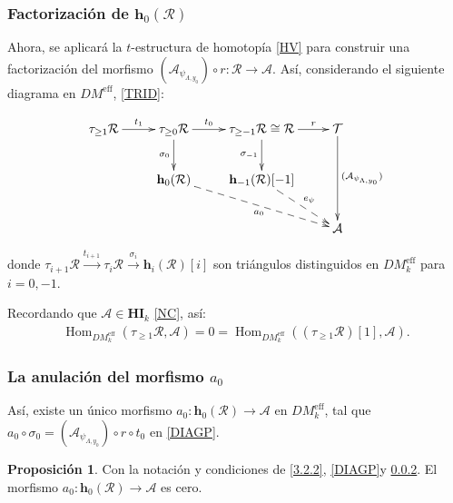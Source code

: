 \documentclass[10pt]{amsart}
\theoremstyle{definition}
\newtheorem{proposition}[definition]{Proposici\'on}
\theoremstyle{remark}
\theoremstyle{definition}
\begin{document}
\subsubsection{Factorización de $\mathbf{h}_{0}(\mathcal R )$ } Ahora, se aplicará la $t$-estructura de homotopía \ref{HV} para construir una factorización del morfismo $(\mathcal{A}_{\psi_{\Lambda,y_{0}}})\circ r:\mathcal{R}\to\mathcal{A}$. Así, considerando el siguiente diagrama en $DM^{\mathrm{eff}}$, \ref{TRID}:


\begin{align}\label{DIAGP}
\begin{split}
\xymatrix{\tau _{\geq 1}\mathcal R \ar[r]^-{t_1}&\tau _{\geq 0}\mathcal R 
\ar[r]^-{t_0} \ar[d]_-{\sigma _0}
& \tau _{\geq -1}\mathcal R \cong \mathcal R 
\ar[d]_-{\sigma _{-1}}  \ar[r]^-r& \mathcal T
\ar[dd]^-{(\mathcal A _{\psi _{\Lambda , y_0}})} \\
& \mathbf{h}_{0} (\mathcal R ) \ar@{-->}[drr]_-{a_0}& \mathbf{h}_{-1} (
\mathcal R )[-1] 
\ar@{-->}[dr]^-{e_\psi}&  \\
&&& \mathcal A}
\end{split}
\end{align}


donde $\tau_{i+1}\mathcal{R} \stackrel{t_{i+1}}{\longrightarrow}
\tau_i \mathcal{R} \stackrel{\sigma_i}{\longrightarrow}
\mathbf{h}_i (\mathcal{R}) [i]$ son triángulos distinguidos en $DM^{\mathrm{eff}}_{k}$
para $i=0, -1$.

Recordando que $\mathcal{A} \in \mathbf{HI}_{k}$ \ref{NC}, así:
\begin{align*}
\operatorname{Hom}_{DM^{\mathrm{eff}}_{k}}(\tau_{\geq 1}\mathcal{R}, \mathcal{A})=0=
\operatorname{Hom}_{DM^{\mathrm{eff}}_{k}}((\tau_{\geq 1}\mathcal{R})[1], \mathcal{A}).
\end{align*}

\subsubsection{La anulación del morfismo  $a_0$}\label{1st.factor}
Así, existe un único morfismo $a_0:\mathbf{h}_0(\mathcal{R}) \rightarrow \mathcal{A}$
en $DM^{\mathrm{eff}}_{k}$, tal que $a_0\circ \sigma_0 = (\mathcal{A}_{\psi_{\Lambda, y_0}})\circ r \circ t_0$ en \eqref{DIAGP}.

\begin{proposition}  \label{prop.main.tech}
Con la notación y condiciones de \ref{3.2.2}, \ref{DIAGP}y \ref{1st.factor}.
El morfismo
$a_0: \mathbf{h}_0(\mathcal{R}) \rightarrow \mathcal{A}$ es cero.
\end{proposition} 
\end{document}

